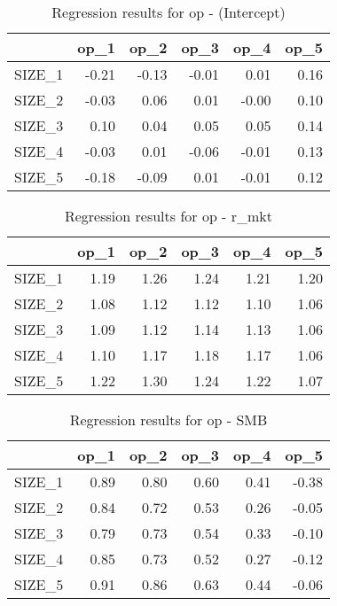 \begin{table}[ht]
\centering
\caption{Regression results for op - (Intercept)} 
\begin{tabular}{rrrrrr}
  \hline
 & op\_1 & op\_2 & op\_3 & op\_4 & op\_5 \\ 
  \hline
SIZE\_1 & -0.21 & -0.13 & -0.01 & 0.01 & 0.16 \\ 
  SIZE\_2 & -0.03 & 0.06 & 0.01 & -0.00 & 0.10 \\ 
  SIZE\_3 & 0.10 & 0.04 & 0.05 & 0.05 & 0.14 \\ 
  SIZE\_4 & -0.03 & 0.01 & -0.06 & -0.01 & 0.13 \\ 
  SIZE\_5 & -0.18 & -0.09 & 0.01 & -0.01 & 0.12 \\ 
   \hline
\end{tabular}
\end{table}


\begin{table}[ht]
\centering
\caption{Regression results for op - r_mkt} 
\begin{tabular}{rrrrrr}
  \hline
 & op\_1 & op\_2 & op\_3 & op\_4 & op\_5 \\ 
  \hline
SIZE\_1 & 1.19 & 1.26 & 1.24 & 1.21 & 1.20 \\ 
  SIZE\_2 & 1.08 & 1.12 & 1.12 & 1.10 & 1.06 \\ 
  SIZE\_3 & 1.09 & 1.12 & 1.14 & 1.13 & 1.06 \\ 
  SIZE\_4 & 1.10 & 1.17 & 1.18 & 1.17 & 1.06 \\ 
  SIZE\_5 & 1.22 & 1.30 & 1.24 & 1.22 & 1.07 \\ 
   \hline
\end{tabular}
\end{table}


\begin{table}[ht]
\centering
\caption{Regression results for op - SMB} 
\begin{tabular}{rrrrrr}
  \hline
 & op\_1 & op\_2 & op\_3 & op\_4 & op\_5 \\ 
  \hline
SIZE\_1 & 0.89 & 0.80 & 0.60 & 0.41 & -0.38 \\ 
  SIZE\_2 & 0.84 & 0.72 & 0.53 & 0.26 & -0.05 \\ 
  SIZE\_3 & 0.79 & 0.73 & 0.54 & 0.33 & -0.10 \\ 
  SIZE\_4 & 0.85 & 0.73 & 0.52 & 0.27 & -0.12 \\ 
  SIZE\_5 & 0.91 & 0.86 & 0.63 & 0.44 & -0.06 \\ 
   \hline
\end{tabular}
\end{table}


